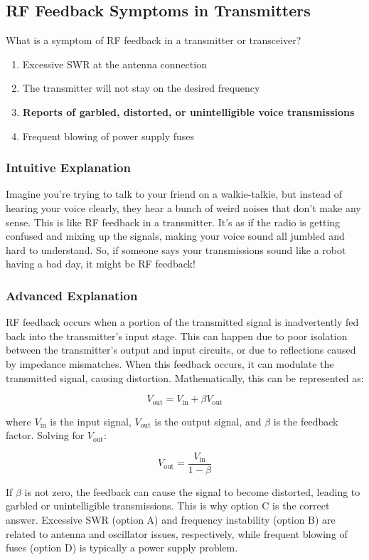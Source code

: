 \subsection{RF Feedback Symptoms in Transmitters}\label{T7B11}

\begin{tcolorbox}[colback=gray!10!white,colframe=black!75!black,title=T7B11]
What is a symptom of RF feedback in a transmitter or transceiver?
\begin{enumerate}[label=\Alph*)]
    \item Excessive SWR at the antenna connection
    \item The transmitter will not stay on the desired frequency
    \item \textbf{Reports of garbled, distorted, or unintelligible voice transmissions}
    \item Frequent blowing of power supply fuses
\end{enumerate}
\end{tcolorbox}

\subsubsection{Intuitive Explanation}
Imagine you're trying to talk to your friend on a walkie-talkie, but instead of hearing your voice clearly, they hear a bunch of weird noises that don't make any sense. This is like RF feedback in a transmitter. It's as if the radio is getting confused and mixing up the signals, making your voice sound all jumbled and hard to understand. So, if someone says your transmissions sound like a robot having a bad day, it might be RF feedback!

\subsubsection{Advanced Explanation}
RF feedback occurs when a portion of the transmitted signal is inadvertently fed back into the transmitter's input stage. This can happen due to poor isolation between the transmitter's output and input circuits, or due to reflections caused by impedance mismatches. When this feedback occurs, it can modulate the transmitted signal, causing distortion. Mathematically, this can be represented as:

\[
V_{\text{out}} = V_{\text{in}} + \beta V_{\text{out}}
\]

where \( V_{\text{in}} \) is the input signal, \( V_{\text{out}} \) is the output signal, and \( \beta \) is the feedback factor. Solving for \( V_{\text{out}} \):

\[
V_{\text{out}} = \frac{V_{\text{in}}}{1 - \beta}
\]

If \( \beta \) is not zero, the feedback can cause the signal to become distorted, leading to garbled or unintelligible transmissions. This is why option C is the correct answer. Excessive SWR (option A) and frequency instability (option B) are related to antenna and oscillator issues, respectively, while frequent blowing of fuses (option D) is typically a power supply problem.

